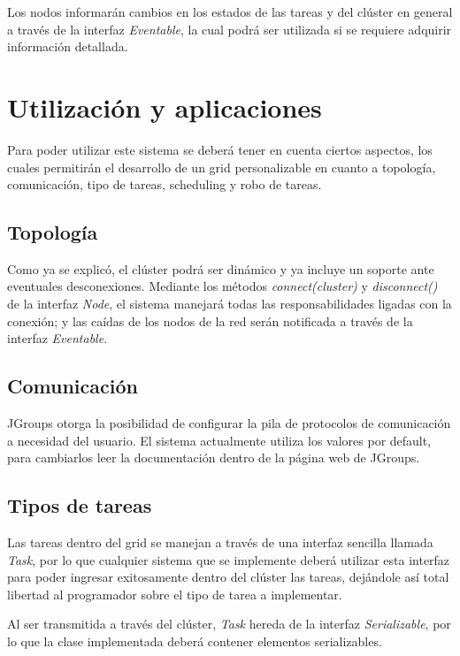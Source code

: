 \documentclass[12pt,a4paper,oneside,spanish]{report}
\begin{document}
Los nodos informarán cambios en los estados de las tareas y del clúster en general a través de la interfaz \textit{Eventable}, la cual podrá ser utilizada si se requiere adquirir información detallada.


\section*{Utilización y aplicaciones}
\label{sec:util}

Para poder utilizar este sistema se deberá tener en cuenta ciertos aspectos, los cuales permitirán el desarrollo de un grid personalizable en cuanto a topología, comunicación, tipo de tareas, scheduling y robo de tareas.

\subsection*{Topología}

Como ya se explicó, el clúster podrá ser dinámico y ya incluye un soporte ante eventuales desconexiones. Mediante los métodos \textit{connect(cluster)} y \textit{disconnect()} de la interfaz \textit{Node}, el sistema manejará todas las responsabilidades ligadas con la conexión; y las caídas de los nodos de la red serán notificada a través de la interfaz \textit{Eventable}.

\subsection*{Comunicación}

JGroups\cite{url:JGroups} otorga la posibilidad de configurar la pila de protocolos de comunicación a necesidad del usuario. El sistema actualmente utiliza los  valores por default, para cambiarlos leer la documentación dentro de la página web de JGroups.

\subsection*{Tipos de tareas}

Las tareas dentro del grid se manejan a través de una interfaz sencilla llamada \textit{Task}, por lo que cualquier sistema que se implemente deberá utilizar esta interfaz para poder ingresar exitosamente dentro del clúster las tareas, dejándole así total libertad al programador sobre el tipo de tarea a implementar.

Al ser transmitida a través del clúster, \textit{Task} hereda de la interfaz \textit{Serializable}, por lo que la clase implementada deberá contener elementos serializables.
\end{document}
